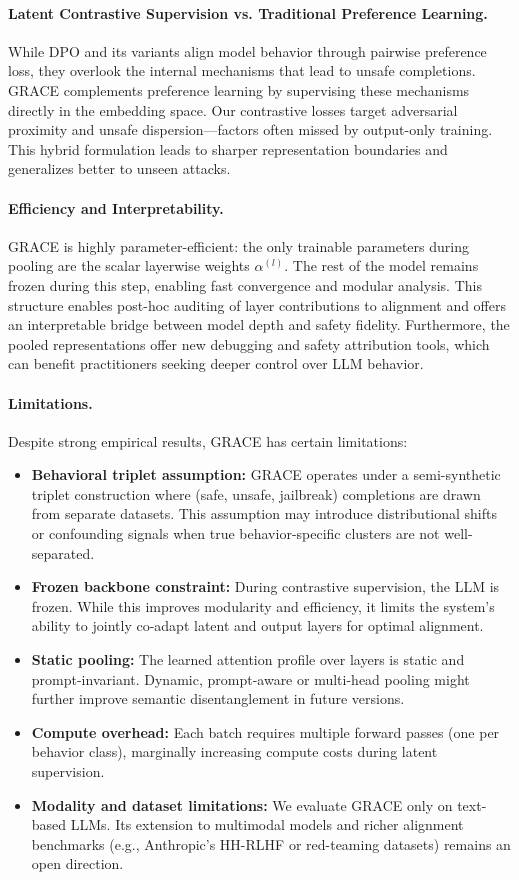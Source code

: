 \paragraph{Latent Contrastive Supervision vs. Traditional Preference Learning.}
While DPO and its variants align model behavior through pairwise preference loss, they overlook the internal mechanisms that lead to unsafe completions. GRACE complements preference learning by supervising these mechanisms directly in the embedding space. Our contrastive losses target adversarial proximity and unsafe dispersion—factors often missed by output-only training. This hybrid formulation leads to sharper representation boundaries and generalizes better to unseen attacks.

\paragraph{Efficiency and Interpretability.}
GRACE is highly parameter-efficient: the only trainable parameters during pooling are the scalar layerwise weights $\alpha^{(l)}$. The rest of the model remains frozen during this step, enabling fast convergence and modular analysis. This structure enables post-hoc auditing of layer contributions to alignment and offers an interpretable bridge between model depth and safety fidelity. Furthermore, the pooled representations offer new debugging and safety attribution tools, which can benefit practitioners seeking deeper control over LLM behavior.

\paragraph{Limitations.}
Despite strong empirical results, GRACE has certain limitations:
\begin{itemize}
    \item \textbf{Behavioral triplet assumption:} GRACE operates under a semi-synthetic triplet construction where (safe, unsafe, jailbreak) completions are drawn from separate datasets. This assumption may introduce distributional shifts or confounding signals when true behavior-specific clusters are not well-separated.
    \item \textbf{Frozen backbone constraint:} During contrastive supervision, the LLM is frozen. While this improves modularity and efficiency, it limits the system’s ability to jointly co-adapt latent and output layers for optimal alignment.
    \item \textbf{Static pooling:} The learned attention profile over layers is static and prompt-invariant. Dynamic, prompt-aware or multi-head pooling might further improve semantic disentanglement in future versions.
    \item \textbf{Compute overhead:} Each batch requires multiple forward passes (one per behavior class), marginally increasing compute costs during latent supervision.
    \item \textbf{Modality and dataset limitations:} We evaluate GRACE only on text-based LLMs. Its extension to multimodal models and richer alignment benchmarks (e.g., Anthropic's HH-RLHF or red-teaming datasets) remains an open direction.
\end{itemize}

